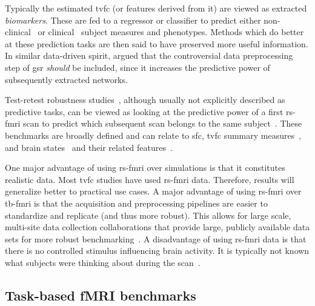 Typically the estimated \gls{tvfc} (or features derived from it) are viewed as extracted \emph{biomarkers}.
These are fed to a regressor or classifier to predict either non-clinical~\parencite[see e.g.][]{Taghia2017, Li2019a} or clinical~\parencite[see e.g.][]{Filippi2019, Du2021} subject measures and phenotypes.
Methods which do better at these prediction tasks are then said to have preserved more useful information.
%
In similar data-driven spirit, \textcite{Li2019a} argued that the controversial data preprocessing step of \gls{gsr} \emph{should} be included, since it increases the predictive power of subsequently extracted networks.

Test-retest robustness studies~\parencite{Noble2019}, although usually not explicitly described as predictive tasks, can be viewed as looking at the predictive power of a first \gls{rs-fmri} scan to predict which subsequent scan belongs to the same subject~\parencite{Fiecas2013, Choe2017, Abrol2017, Zhang2018, Elliott2020}.
These benchmarks are broadly defined and can relate to \gls{sfc}, \gls{tvfc} summary measures~\parencite{Abrol2017, Choe2017}, and brain states~\parencite{Abrol2016} and their related features~\parencite{Abrol2017}.

One major advantage of using \gls{rs-fmri} over simulations is that it constitutes realistic data.
Most \gls{tvfc} studies have used \gls{rs-fmri} data.
Therefore, results will generalize better to practical use cases.
%
A major advantage of using \gls{rs-fmri} over \gls{tb-fmri} is that the acquisition and preprocessing pipelines are easier to standardize and replicate (and thus more robust).
This allows for large scale, multi-site data collection collaborations that provide large, publicly available data sets for more robust benchmarking~\parencite[see e.g.][]{VanEssen2012, Allen2014b}.
A disadvantage of using \gls{rs-fmri} data is that there is no controlled stimulus influencing brain activity.
It is typically not known what subjects were thinking about during the scan~\parencite[see also][]{Finn2021}.

\subsection{Task-based fMRI benchmarks}

